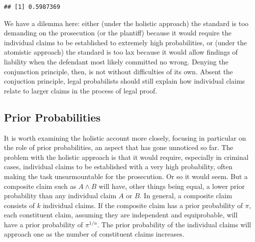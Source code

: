 \documentclass[10pt,dvipsnames,enabledeprecatedfontcommands]{scrartcl}
\begin{document}
\begin{verbatim}
## [1] 0.5987369
\end{verbatim}

We have a dilemma here: either (under the holistic approach) the
standard is too demanding on the prosecution (or the plantiff) because
it would require the individual claims to be established to extremely
high probabilities, or (under the atomistic approach) the standard is
too lax because it would allow findings of liability when the defendant
most likely committed no wrong. Denying the conjunction principle, then,
is not without difficulties of its own. Absent the conjuction principle,
legal probabilists should still explain how individual claims relate to
larger claims in the process of legal proof.

\hypertarget{prior-probabilities}{%
\subsection{Prior Probabilities}\label{prior-probabilities}}

It is worth examining the holistic account more closely, focusing in
particular on the role of prior probabilities, an aspect that has gone
unnoticed so far. The problem with the holistic approach is that it
would require, especially in criminal cases, individual claims to be
established with a very high probability, often making the task
unsurmountable for the prosecution. Or so it would seem. But a composite
claim such as \(A\wedge B\) will have, other things being equal, a lower
prior probability than any individual claim \(A\) or \(B\). In general,
a composite claim consists of \(k\) individual claims. If the composite
claim has a prior probability of \(\pi\), each constituent claim,
assuming they are independent and equiprobable, will have a prior
probability of \(\pi^{1/n}\). The prior probability of the individual
claims will approach one as the number of constituent claims increases.
\end{document}
